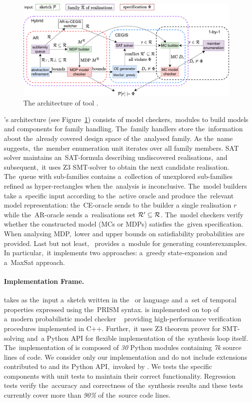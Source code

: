 \begin{figure}[h!]
\centering
\includegraphics[width=1.0\textwidth]{figures/architecture.pdf}
\caption{The architecture of tool \toolname{}.}%
\label{fig:architecture}%
\end{figure}

\toolname{}'s architecture (see Figure~\ref{fig:architecture}) consists of model checkers,~modules to build models and components for family handling.
The~family handlers store the~information about the~already covered design space of the~analysed family.
As the~name suggests,~the~member enumeration unit iterates over all family members.
SAT solver maintains an~SAT-formula describing undiscovered realisations,~and subsequent,~it uses Z3 SMT-solver to obtain the next candidate realisation.
The~queue with sub-families contains a~collection of unexplored sub-families refined as hyper-rectangles when the~analysis is inconclusive.
The~model builders take a~specific input according to the~active oracle and produce the~relevant model representation:
the~CE-oracle sends to the builder a single realisation $r$ while 
the~AR-oracle sends a~realisations set $\mathcal{R}' \subseteq \mathcal{R}$.
The~model checkers verify whether the constructed model (MCs or MDPs) satisfies the~given specification.
When analysing MDP,~lower and upper bounds on satisfiability probabilities are provided.
Last but not least,~\toolname{} provides a~module for generating counterexamples. In particular,~it implements two approaches: a~greedy state-expansion and a~MaxSat approach.

\paragraph{Implementation Frame.}
\toolname{} takes as the~input a~sketch written in the~\jani{} or \prism{} language and a~set of temporal properties expressed using the~PRISM syntax. 
\toolname{} is implemented on top of a~modern probabilistic model checker \storm{}~\cite{STORM} providing  high-performance verification procedures implemented in C++.
Further,~it uses Z3 theorem prover for SMT-solving and~a Python API for flexible implementation of the~synthesis loop itself.
The~implementation of \toolname{} is composed of \textit{30} Python modules containing \textit{7k} source lines of code.
We consider only our implementation and do not include extensions contributed to \storm{} and its Python API,~invoked by \toolname{}.
We tests the specific components with unit tests to maintain their correct functionality.
Regression tests verify the~accuracy and correctness of the~synthesis results and these tests currently cover more than \textit{90\%} of the~source code lines.

